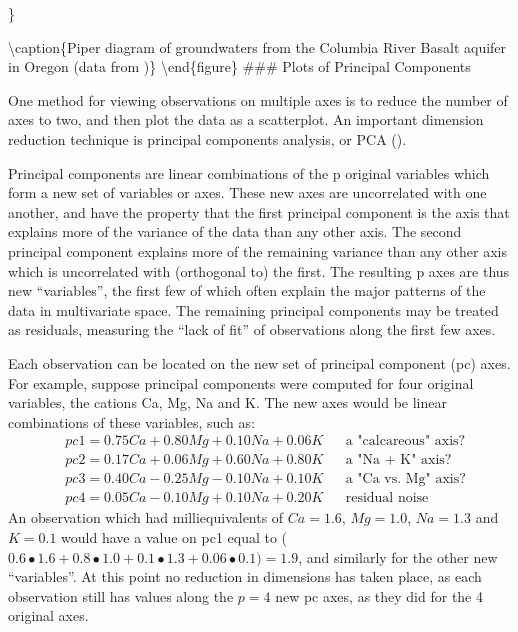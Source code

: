 \documentclass[]{book}
\begin{document}
\}

\textbackslash{}caption\{Piper diagram of groundwaters from the Columbia River Basalt aquifer in Oregon (data from \citet{miller_oregon_1984})\}\label{fig:fig-2-37}
\textbackslash{}end\{figure\}
\#\#\# Plots of Principal Components

One method for viewing observations on multiple axes is to reduce the number of axes to two, and then plot the data as a scatterplot. An important dimension reduction technique is principal components analysis, or PCA (\citet{johnson_applied_1982}).

Principal components are linear combinations of the p original variables which form a new set of variables or axes. These new axes are uncorrelated with one another, and have the property that the first principal component is the axis that explains more of the variance of the data than any other axis. The second principal component explains more of the remaining variance than any other axis which is uncorrelated with (orthogonal to) the first. The resulting p axes are thus new ``variables'', the first few of which often explain the major patterns of the data in multivariate space. The remaining principal components may be treated as residuals, measuring the ``lack of fit'' of observations along the first few axes.

Each observation can be located on the new set of principal component (pc) axes. For example, suppose principal components were computed for four original variables, the cations Ca, Mg, Na and K. The new axes would be linear combinations of these variables, such as:
\begin{equation}
\begin{aligned}
& pc1 = 0.75 Ca + 0.80 Mg + 0.10 Na + 0.06 K && \text{a "calcareous" axis?}\\
& pc2 = 0.17 Ca + 0.06 Mg + 0.60 Na + 0.80 K && \text{a "Na + K" axis?}\\
& pc3 = 0.40 Ca - 0.25 Mg - 0.10 Na + 0.10 K && \text{a "Ca vs. Mg" axis?}\\
& pc4 = 0.05 Ca - 0.10 Mg + 0.10 Na + 0.20 K && \text{residual noise}
\end{aligned}
\end{equation}
An observation which had milliequivalents of \(Ca = 1.6\), \(Mg = 1.0\), \(Na = 1.3\) and \(K = 0.1\) would have a value on pc1 equal to (\(0.6 \bullet 1.6 + 0.8 \bullet 1.0 + 0.1 \bullet 1.3 + 0.06 \bullet 0.1) = 1.9\), and similarly for the other new ``variables''. At this point no reduction in dimensions has taken place, as each observation still has values along the \(p = 4\) new pc axes, as they did for the 4 original axes.
\end{document}

